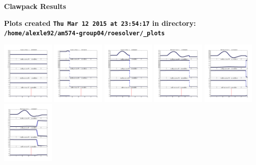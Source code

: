\documentclass[11pt]{article}
\begin{document}
        \begin{center}{\Large\bf Clawpack Results}\vskip 5pt
        
        \bf Plots created {\tt Thu Mar 12 2015 at 23:54:17} in directory: \vskip 5pt
        \verb+/home/alexle92/am574-group04/roesolver/_plots+
        \end{center}
        \vskip 5pt
        \includegraphics[width=0.19\textwidth]{frame0000fig1.png}
\vskip 10pt 
\includegraphics[width=0.19\textwidth]{frame0001fig1.png}
\vskip 10pt 
\includegraphics[width=0.19\textwidth]{frame0002fig1.png}
\vskip 10pt 
\includegraphics[width=0.19\textwidth]{frame0003fig1.png}
\vskip 10pt 
\includegraphics[width=0.19\textwidth]{frame0004fig1.png}
\vskip 10pt 
\includegraphics[width=0.19\textwidth]{frame0005fig1.png}
\end{document}
